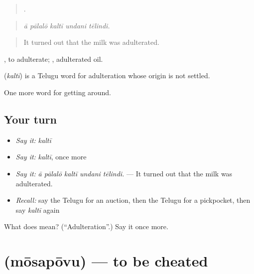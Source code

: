 \begin{quote}
    .
\end{quote}

\begin{quote}
\emph{ā pālalō kaltī undani tēlindi.}
\end{quote}

\begin{quote}
It turned out that the milk was adulterated.
\end{quote}

 , to adulterate;  , adulterated oil.

\begin{cousinweb}
\textbf{} (\emph{kaltī}) is a Telugu word for adulteration whose origin is not settled.
\end{cousinweb}

\begin{grammarlens}[title={What you've built}]
One more word for getting around.
\end{grammarlens}

\subsection*{Your turn}
\begin{itemize}
\raggedright
  \item \emph{Say it:} \emph{kaltī}
  \item \emph{Say it:} \emph{kaltī}, once more
  \item \emph{Say it:} \emph{ā pālalō kaltī undani tēlindi.} — It turned out that the milk was adulterated.
  \item \emph{Recall:} say the Telugu for an auction, then the Telugu for a pickpocket, then say \emph{kaltī} again
\end{itemize}

\begin{tcolorbox}[breakable,colback=teal!4,colframe=teal!35!black,title={Before you move on}]
What does  mean? (\textquotedblleft{}Adulteration\textquotedblright{}.) Say it once more.
\end{tcolorbox}
\section[\texorpdfstring{\te{మోసపోవు} (mōsapōvu)}{మోసపోవు (mōsapōvu)}]{ (mōsapōvu) — to be cheated}

\label{lesson:TE-C489-mosapovu}



